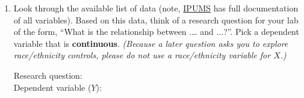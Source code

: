 \documentclass[11pt]{article}
\begin{document}
\begin{enumerate}
\def\labelenumi{\arabic{enumi}.}
\setcounter{enumi}{5}
\item
  Look through the available list of data (note,
  \href{https://cps.ipums.org/cps/}{IPUMS} has full documentation of all
  variables). Based on this data, think of a research question for your
  lab of the form, ``What is the relationship between .\ldots{} and
  ...?''. Pick a dependent variable that is \textbf{continuous}.
  \emph{(Because a later question asks you to explore race/ethnicity
  controls, please do not use a race/ethnicity variable for \(X\).)}

  Research question:\\

  Dependent variable (\(Y\)):\\


\end{enumerate}
\end{document}
